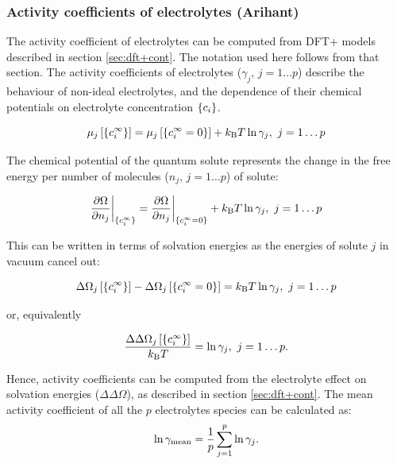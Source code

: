 \documentclass[../main.tex]{subfiles}
\begin{document}
\subsubsection{Activity coefficients of electrolytes (Arihant)}
\label{sec:tf}

The activity coefficient of electrolytes can be computed from DFT+\pbe{} models described in section \ref{sec:dft+cont}.\cite{Ringe2016, Dziedzic2020} The notation used here follows from that section. The activity coefficients of electrolytes ($\gamma_j$, $j=1\dots p$) describe the behaviour of non-ideal electrolytes, and the dependence of their chemical potentials on electrolyte concentration $\{c_i\}$.\cite{Atkins2014}

\begin{equation}
    \label{eq:mujid}
    \mu_j\left[\{c_i^{\infty}\}\right]=\mu_j\left[\{c_i^{\infty}=0\}\right]+ k_{\textrm{B}} T\ln{\gamma_j},  \ j=1\dots p
\end{equation}

The chemical potential of the quantum solute represents the change in the free energy per number of molecules ($n_j$, $j=1\dots p$) of solute:

\begin{equation}
    \label{eq:dtdn}
    \frac{\partial \Omega}{\partial n_j}\bigg|_{\{c_i^{\infty}\}}=\frac{\partial \Omega}{\partial n_j}\bigg|_{\{c_i^{\infty}=0\}}+ k_{\textrm{B}} T\ln{\gamma_j}, \ j=1\dots p
\end{equation}

This can be written in terms of solvation energies as the energies of solute $j$ in vacuum cancel out:

\begin{equation}
    \label{eq:dtc}
    \Delta\Omega_j\left[{\{c_i^{\infty}\}}\right]-\Delta\Omega_j\left[{\{c_i^{\infty}=0\}}\right]=k_{\textrm{B}} T \ln{\gamma_j}, \ j=1\dots p
\end{equation}

or, equivalently

\begin{equation}
    \label{eq:activityj}
    \frac{\Delta\Delta\Omega_j\left[\{c_i^{\infty}\}\right]}{k_{\textrm{B}} T} =\ln{\gamma_j}, \ j=1\dots p.
\end{equation}

Hence, activity coefficients can be computed from the electrolyte effect on solvation energies ($\Delta\Delta\Omega$), as described in section \ref{sec:dft+cont}. The mean activity coefficient of all the $p$ electrolytes species can be calculated as:
\begin{equation}
    \label{eq:activitymean}
    \ln \gamma_{\rm mean} = \frac{1}{p}\sum_{j=1}^p \ln \gamma_j.
\end{equation}
\end{document}
